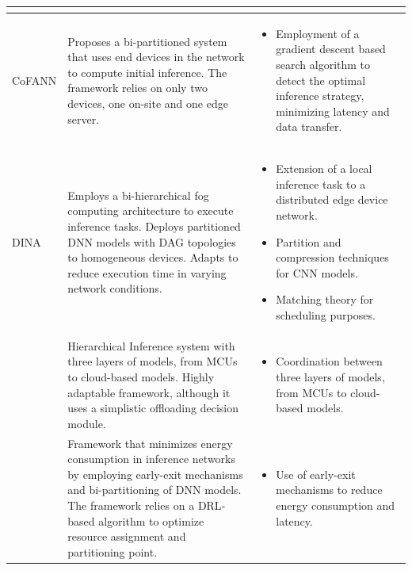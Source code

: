 \begin{xltabular}{\textwidth}{|m{2.4cm}|X|X|}
\begin{itemize}[noitemsep, topsep=0pt, leftmargin=*]
    \end{itemize}
\\
\hline
CoFANN \cite{tran-van_cofann_2025} 
& 
    Proposes a bi-partitioned system that uses end devices in the network to compute 
    initial inference. The framework relies on only two devices, one on-site and
    one edge server. 
&  
    \begin{itemize}[noitemsep, topsep=0pt, leftmargin=*]
        \item Employment of a gradient descent based search algorithm to detect the optimal
        inference strategy, minimizing latency and data transfer.  
    \end{itemize}
\\
\hline
DINA \cite{t_mohammed_distributed_2020} 
& 
    Employs a bi-hierarchical fog computing architecture to execute inference tasks.
    Deploys partitioned \ac{DNN} models with \ac{DAG} topologies to homogeneous
    devices. Adapts to reduce execution time in varying network conditions.
&  
    \begin{itemize}[noitemsep, topsep=0pt, leftmargin=*]
        \item Extension of a local inference task to a distributed edge device network.
        \item Partition and compression techniques for \ac{CNN} models.
        \item Matching theory for scheduling purposes.
    \end{itemize}
\\
\hline
\textcite{e_m_k_adaptive_2025}
&
    Hierarchical Inference system with three layers of models, from \acp{MCU}
    to cloud-based models. Highly adaptable framework, although it uses a 
    simplistic offloading decision module.
&
    \begin{itemize}[noitemsep, topsep=0pt, leftmargin=*]
        \item Coordination between three layers of models, from \acp{MCU} to cloud-based models.
    \end{itemize}
\\
\hline
\textcite{ma_joint_2025} 
& 
    Framework that minimizes energy consumption in inference networks by employing
    early-exit mechanisms and bi-partitioning of \ac{DNN} models. The framework
    relies on a \ac{DRL}-based algorithm to optimize resource assignment and
    partitioning point.
&  
    \begin{itemize}[noitemsep, topsep=0pt, leftmargin=*]
        \item Use of early-exit mechanisms to reduce energy consumption and latency.

\end{itemize}
\end{xltabular}
